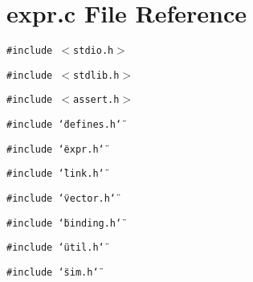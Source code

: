 \section{expr.c File Reference}
\label{expr_8c}
{\tt \#include $<$stdio.h$>$}\par
{\tt \#include $<$stdlib.h$>$}\par
{\tt \#include $<$assert.h$>$}\par
{\tt \#include \char`\"{}defines.h\char`\"{}}\par
{\tt \#include \char`\"{}expr.h\char`\"{}}\par
{\tt \#include \char`\"{}link.h\char`\"{}}\par
{\tt \#include \char`\"{}vector.h\char`\"{}}\par
{\tt \#include \char`\"{}binding.h\char`\"{}}\par
{\tt \#include \char`\"{}util.h\char`\"{}}\par
{\tt \#include \char`\"{}sim.h\char`\"{}}\par
